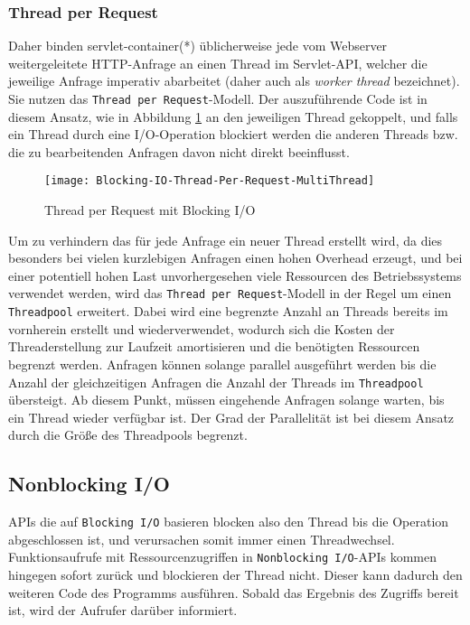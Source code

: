\subsubsection{Thread per Request}
\label{subsubsec:thread per request}
Daher binden \Gls{servlet-container}(*) üblicherweise jede vom Webserver weitergeleitete HTTP-Anfrage an einen
Thread im Servlet-API, welcher die jeweilige Anfrage imperativ abarbeitet
(daher auch als \textit{worker thread} bezeichnet). Sie nutzen das \verb|Thread per Request|-Modell.
Der auszuführende Code ist in diesem Ansatz, wie in Abbildung \ref{fig:blocking_thread_per_request}
an den jeweiligen Thread gekoppelt, und falls ein Thread durch eine I/O-Operation blockiert werden
die anderen Threads bzw. die zu bearbeitenden Anfragen davon nicht direkt beeinflusst.
\begin{figure}[ht!]
  \centering
  \texttt{[image: Blocking-IO-Thread-Per-Request-MultiThread]}
  \caption{Thread per Request mit Blocking I/O}
  \label{fig:blocking_thread_per_request}
\end{figure}

Um zu verhindern das für jede Anfrage ein neuer Thread erstellt wird, da dies besonders bei vielen kurzlebigen
Anfragen einen hohen Overhead erzeugt, und bei einer potentiell hohen Last
unvorhergesehen viele Ressourcen des Betriebssystems verwendet werden, wird das \verb|Thread per Request|-Modell in der Regel um einen \verb|Threadpool| erweitert.
Dabei wird eine begrenzte Anzahl an Threads bereits im vornherein erstellt und wiederverwendet, wodurch sich die Kosten der Threaderstellung
zur Laufzeit amortisieren und die benötigten Ressourcen begrenzt werden.
Anfragen können solange parallel ausgeführt werden bis die Anzahl der gleichzeitigen Anfragen die
Anzahl der Threads im \verb|Threadpool| übersteigt.
Ab diesem Punkt, müssen eingehende Anfragen solange warten, bis ein Thread wieder verfügbar ist.
Der Grad der Parallelität ist bei diesem Ansatz durch die Größe des Threadpools begrenzt.
\newpage
\subsection{Nonblocking I/O}
\label{subsec:nonblocking-i/o}
APIs die auf \verb|Blocking I/O| basieren blocken also den Thread bis die Operation abgeschlossen ist, und verursachen somit
immer einen Threadwechsel.
Funktionsaufrufe mit Ressourcenzugriffen in \verb|Nonblocking I/O|-APIs kommen hingegen sofort zurück und blockieren der Thread nicht.
Dieser kann dadurch den weiteren Code des Programms ausführen.
Sobald das Ergebnis des Zugriffs bereit ist, wird der Aufrufer darüber informiert.

